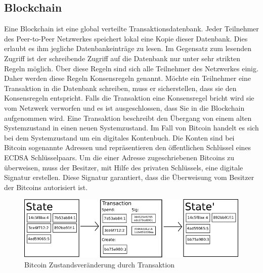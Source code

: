 \subsection{Blockchain}
Eine Blockchain ist eine global verteilte Transaktionsdatenbank. Jeder Teilnehmer des Peer-to-Peer Netzwerkes speichert lokal eine Kopie dieser Datenbank. Dies erlaubt es ihm jegliche Datenbankeinträge zu lesen. Im Gegensatz zum lesenden Zugriff ist der schreibende Zugriff auf die Datenbank nur unter sehr strikten Regeln möglich. Über diese Regeln sind sich alle Teilnehmer des Netzwerkes einig. Daher werden diese Regeln Konsensregeln genannt. Möchte ein Teilnehmer eine Transaktion in die Datenbank schreiben, muss er sicherstellen, dass sie den Konsensregeln entspricht. Falls die Transaktion eine Konsensregel bricht wird sie vom Netzwerk verworfen und es ist ausgeschlossen, dass Sie in die Blockchain aufgenommen wird. Eine Transaktion beschreibt den Übergang von einem alten Systemzustand in einen neuen Systemzustand.
Im Fall von Bitcoin handelt es sich bei dem Systemzustand um ein digitales Kontenbuch. Die Konten sind bei Bitcoin sogenannte Adressen und repräsentieren den öffentlichen Schlüssel eines ECDSA Schlüsselpaars. Um die einer Adresse zugeschriebenen Bitcoins zu überweisen, muss der Besitzer, mit Hilfe des privaten Schlüssels, eine digitale Signatur erstellen. Diese Signatur garantiert, dass die Überweisung vom Besitzer der Bitcoins autorisiert ist.

\begin{figure}[H]
\centering
\includegraphics[width=1\linewidth]{Figures/BTC_statetransition_ETH_white_paper}
\decoRule
\caption{Bitcoin Zustandsveränderung durch Transaktion}
\label{fig:BTC_statetransition_ETH_white_paper}
\end{figure}

